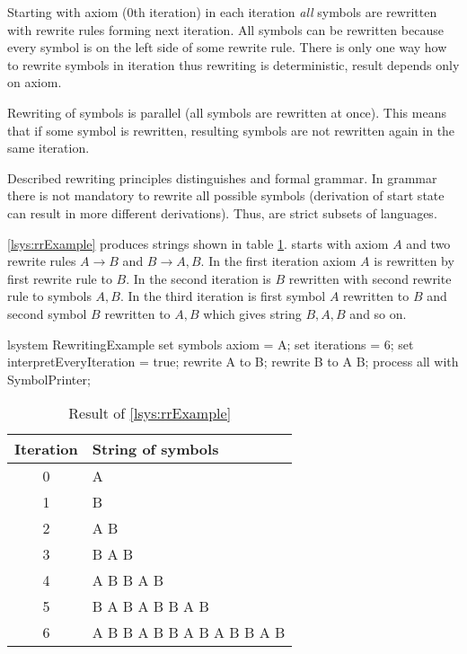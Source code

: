 Starting with axiom (0th iteration) in each iteration \emph{all} symbols are rewritten with rewrite rules forming next iteration.
All symbols can be rewritten because every symbol is on the left side of some rewrite rule.
There is only one way how to rewrite symbols in iteration thus rewriting is deterministic, result depends only on axiom.

Rewriting of symbols is parallel (all symbols are rewritten at once).
This means that if some symbol is rewritten, resulting symbols are not rewritten again in the same iteration.

Described rewriting principles distinguishes \lsystem and formal grammar.
In grammar there is not mandatory to rewrite all possible symbols (derivation of start state can result in more different derivations).
Thus, \lsystems are strict subsets of languages.

\lsystem \ref{lsys:rrExample} produces strings shown in table \ref{fig:rrExampleResult}.
\lsystem starts with axiom $A$ and two rewrite rules $A \rightarrow B$ and $B \rightarrow A, B$.
In the first iteration axiom $A$ is rewritten by first rewrite rule to $B$.
In the second iteration is $B$ rewritten with second rewrite rule to symbols $A, B$.
In the third iteration is first symbol $A$ rewritten to $B$ and second symbol $B$ rewritten to $A, B$ which gives string $B, A, B$ and so on.

\begin{Lsystem}[label=lsys:rrExample,caption={Simple \lsystem as example of rewriting principles}]
lsystem RewritingExample {
	set symbols axiom = A;
	set iterations = 6;
	set interpretEveryIteration = true;
	rewrite A to B;
	rewrite B to A B;
}
process all with SymbolPrinter;
\end{Lsystem}

\begin{table}[ht]
	\centering
	\begin{tabular}{c l}
   		\toprule
   		Iteration & String of symbols \\
   		\midrule
		0 & A \\
		1 & B \\
		2 & A B \\
		3 & B A B \\
		4 & A B B A B \\
		5 & B A B A B B A B \\
		6 & A B B A B B A B A B B A B \\
		\bottomrule
	\end{tabular}
	\caption{Result of \lsystem \ref{lsys:rrExample}}
	\label{fig:rrExampleResult}
\end{table}


